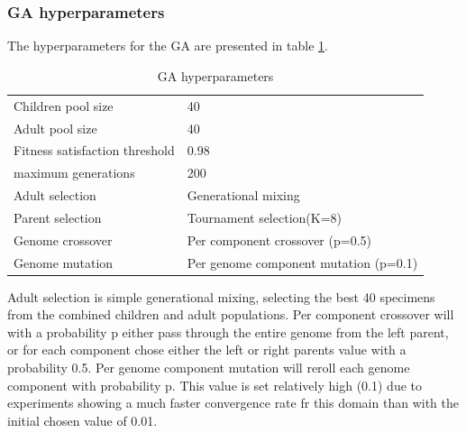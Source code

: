\subsubsection{GA hyperparameters}

The hyperparameters for the GA are presented in table \ref{table:ga-hyperparameters}.

\begin{table}
  \centering
  \caption{GA hyperparameters}
  \label{table:ga-hyperparameters}
  \begin{tabular}{ll}
    Children pool size             & 40                                    \\
    Adult pool size                & 40                                    \\
    Fitness satisfaction threshold & 0.98                                  \\
    maximum generations            & 200                                   \\
    Adult selection                & Generational mixing                   \\
    Parent selection               & Tournament selection(K=8)             \\
    Genome crossover               & Per component crossover (p=0.5)       \\
    Genome mutation                & Per genome component mutation (p=0.1) \\
  \end{tabular}
\end{table}

Adult selection is simple generational mixing,
selecting the best 40 specimens from the combined children and adult populations.
Per component crossover will with a probability p either pass through the entire genome from the left parent,
or for each component chose either the left or right parents value with a probability 0.5.
Per genome component mutation will reroll each genome component with probability p.
This value is set relatively high (0.1) due to experiments showing a much faster convergence rate fr this domain than with the initial chosen value of 0.01.
